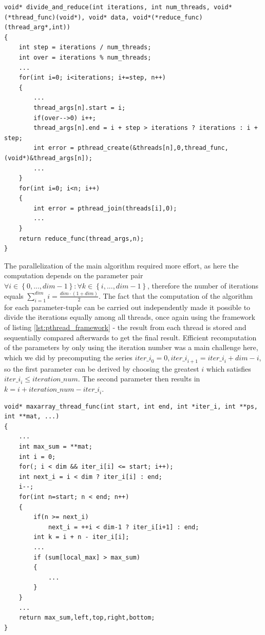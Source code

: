 \documentclass[conference]{IEEEtran}
\begin{document}
\begin{center}
   \begin{lstlisting}[captionpos=b, caption=pthread: Framework used for dividing iterations among a fixed number of threads and reducing the results afterwards, label=lst:pthread_framework]
void* divide_and_reduce(int iterations, int num_threads, void*(*thread_func)(void*), void* data, void*(*reduce_func)(thread_arg*,int))
{
	int step = iterations / num_threads;
	int over = iterations % num_threads;
	...
	for(int i=0; i<iterations; i+=step, n++)
	{
		...
		thread_args[n].start = i;
		if(over-->0) i++;
		thread_args[n].end = i + step > iterations ? iterations : i + step;
		int error = pthread_create(&threads[n],0,thread_func,(void*)&thread_args[n]);
		...
	}
	for(int i=0; i<n; i++)
	{
		int error = pthread_join(threads[i],0);
		...
	}
	return reduce_func(thread_args,n);
}
   \end{lstlisting}
\end{center}

The parallelization of the main algorithm required more effort, as here the computation depends on the parameter pair $\forall i\in \left\lbrace 0,...,\mathit{dim}-1 \right\rbrace :\forall k\in \left\lbrace i,...,\mathit{dim}-1 \right\rbrace$, therefore the number of iterations equals $\sum^{\mathit{dim}}_{i=1}i=\frac{\mathit{dim}\cdot (1+\mathit{dim})}{2}$. The fact that the computation of the algorithm for each parameter-tuple can be carried out independently made it possible to divide the iterations equally among all threads, once again using the framework of listing \ref{lst:pthread_framework} - the result from each thread is stored and sequentially compared afterwards to get the final result. Efficient recomputation of the parameters by only using the iteration number was a main challenge here, which we did by precomputing the series $\mathit{iter\_i}_0=0, \mathit{iter\_i}_{i+1}=\mathit{iter\_i}_{i}+\mathit{dim}-i$, so the first parameter can be derived by choosing the greatest $i$ which satisfies $\mathit{iter\_i}_i\leq \mathit{iteration\_num}$. The second parameter then results in $k=i+\mathit{iteration\_num}-\mathit{iter\_i}_{i}$.

\begin{center}
   \begin{lstlisting}[captionpos=b, caption=pthread: Parallel Main Algorithm (simplified), label=lst:pthread_maincomp]
void* maxarray_thread_func(int start, int end, int *iter_i, int **ps, int **mat, ...)
{
	...
	int max_sum = **mat;
	int i = 0;
	for(; i < dim && iter_i[i] <= start; i++);
	int next_i = i < dim ? iter_i[i] : end;
	i--;
	for(int n=start; n < end; n++)
	{
		if(n >= next_i) 
			next_i = ++i < dim-1 ? iter_i[i+1] : end;
		int k = i + n - iter_i[i];
		...
		if (sum[local_max] > max_sum)
		{
			...
		}
	}
	...
	return max_sum,left,top,right,bottom;
}
        
   \end{lstlisting}
\end{center}
\end{document}
